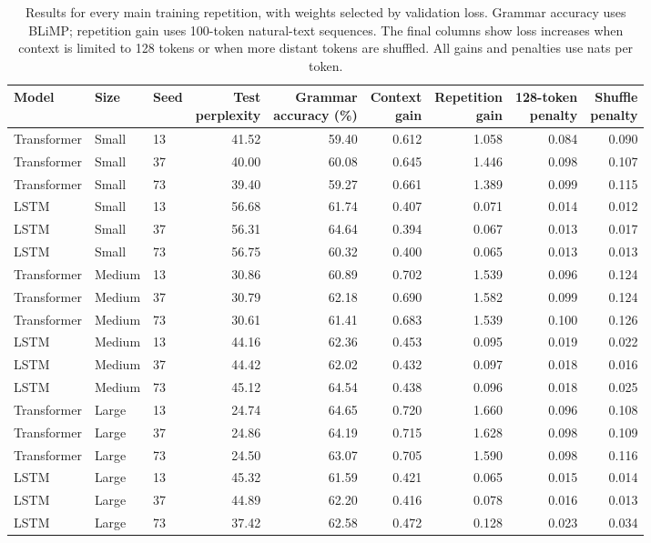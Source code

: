 \documentclass[10pt]{article}
\begin{document}
\begin{table}[ht]
\centering
\small
\setlength{\tabcolsep}{3pt}
\begin{tabular}{lllrrrrrr}
\toprule
Model & Size & Seed & \shortstack{Test\\perplexity} & \shortstack{Grammar\\accuracy (\%)} & \shortstack{Context\\gain} & \shortstack{Repetition\\gain} & \shortstack{128-token\\penalty} & \shortstack{Shuffle\\penalty} \\
\midrule
Transformer & Small & 13 & 41.52 & 59.40 & 0.612 & 1.058 & 0.084 & 0.090 \\
Transformer & Small & 37 & 40.00 & 60.08 & 0.645 & 1.446 & 0.098 & 0.107 \\
Transformer & Small & 73 & 39.40 & 59.27 & 0.661 & 1.389 & 0.099 & 0.115 \\
LSTM & Small & 13 & 56.68 & 61.74 & 0.407 & 0.071 & 0.014 & 0.012 \\
LSTM & Small & 37 & 56.31 & 64.64 & 0.394 & 0.067 & 0.013 & 0.017 \\
LSTM & Small & 73 & 56.75 & 60.32 & 0.400 & 0.065 & 0.013 & 0.013 \\
\midrule
Transformer & Medium & 13 & 30.86 & 60.89 & 0.702 & 1.539 & 0.096 & 0.124 \\
Transformer & Medium & 37 & 30.79 & 62.18 & 0.690 & 1.582 & 0.099 & 0.124 \\
Transformer & Medium & 73 & 30.61 & 61.41 & 0.683 & 1.539 & 0.100 & 0.126 \\
LSTM & Medium & 13 & 44.16 & 62.36 & 0.453 & 0.095 & 0.019 & 0.022 \\
LSTM & Medium & 37 & 44.42 & 62.02 & 0.432 & 0.097 & 0.018 & 0.016 \\
LSTM & Medium & 73 & 45.12 & 64.54 & 0.438 & 0.096 & 0.018 & 0.025 \\
\midrule
Transformer & Large & 13 & 24.74 & 64.65 & 0.720 & 1.660 & 0.096 & 0.108 \\
Transformer & Large & 37 & 24.86 & 64.19 & 0.715 & 1.628 & 0.098 & 0.109 \\
Transformer & Large & 73 & 24.50 & 63.07 & 0.705 & 1.590 & 0.098 & 0.116 \\
LSTM & Large & 13 & 45.32 & 61.59 & 0.421 & 0.065 & 0.015 & 0.014 \\
LSTM & Large & 37 & 44.89 & 62.20 & 0.416 & 0.078 & 0.016 & 0.013 \\
LSTM & Large & 73 & 37.42 & 62.58 & 0.472 & 0.128 & 0.023 & 0.034 \\
\midrule
\bottomrule
\end{tabular}
\caption{Results for every main training repetition, with weights selected by validation loss. Grammar accuracy uses BLiMP; repetition gain uses 100-token natural-text sequences. The final columns show loss increases when context is limited to 128 tokens or when more distant tokens are shuffled. All gains and penalties use nats per token.}
\label{tab:seeds}
\end{table}
\end{document}
